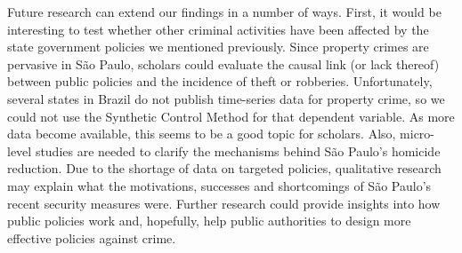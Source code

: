 \documentclass[a4paper,11pt]{article}
\begin{document}
Future research can extend our findings in a number of ways. First, it would be interesting to test whether other criminal activities have been affected by the state government policies we mentioned previously. Since property crimes are pervasive in S\~{a}o Paulo, scholars could evaluate the causal link (or lack thereof) between public policies and the incidence of theft or robberies. Unfortunately, several states in Brazil do not publish time-series data for property crime, so we could not use the Synthetic Control Method for that dependent variable. As more data become available, this seems to be a good topic for scholars. Also, micro-level studies are needed to clarify the mechanisms behind S\~{a}o Paulo's homicide reduction. Due to the shortage of data on targeted policies, qualitative research may explain what the motivations, successes and shortcomings of S\~{a}o Paulo's recent security measures were. Further research could provide insights into how public policies work and, hopefully, help public authorities to design more effective policies against crime.

\newpage


\end{document}
